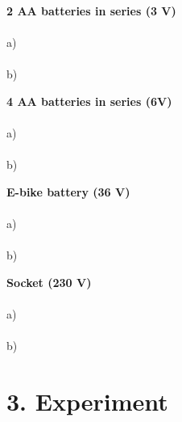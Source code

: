 \documentclass[a4paper,12pt]{article}
\begin{document}
	\vspace{0.3 cm} 
	\textbf{2 AA batteries in series (3 V)} \\ 
	\vspace{0.3 cm}\\ 
	a) \underline{\hspace{15 cm}} \\ 
	\vspace{0.3 cm}\\ 
	b) \underline{\hspace{15 cm}} 
	
	
	\vspace{0.3 cm} 
	\textbf{4 AA batteries in series (6V)} \\ 
	\vspace{0.3 cm}\\ 
	a) \underline{\hspace{15 cm}} \\ 
	\vspace{0.3 cm}\\ 
	b) \underline{\hspace{15 cm}}
	
	\newpage 
	\vspace{0.3 cm} 
	\textbf{E-bike battery (36 V)} \\ 
	\vspace{0.3 cm}\\ 
	a) \underline{\hspace{15 cm}} \\ 
	\vspace{0.3 cm}\\ 
	b) \underline{\hspace{15 cm}} 
	
	\vspace{0.3 cm} 
	\textbf{Socket (230 V)} \\ 
	\vspace{0.3 cm}\\ 
	a) \underline{\hspace{15 cm}} \\ 
	\vspace{0.3 cm}\\ 
	b) \underline{\hspace{15 cm}}
	
	
	
	\section*{3. Experiment}
	
\end{document}
